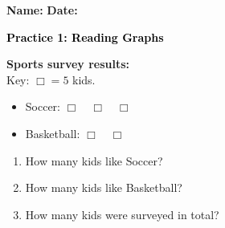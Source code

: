 \documentclass[12pt, letterpaper, fleqn]{article}
\newcommand{\blank}{\underline{\hspace{2.2cm}}}
\begin{document}
\textbf{Name:} \underline{\hspace{5cm}}
\hfill
\textbf{Date:} \underline{\hspace{3cm}}\\

\begin{tcolorbox}[colback=customteal!20]
    \large\textcolor{black}{\textbf{Practice 1: Reading Graphs}}
\end{tcolorbox}

\vspace{5mm}
\noindent
\textbf{Sports survey results:}
\\
Key: $\Box = 5$ kids.
\begin{itemize}
  \item Soccer: $\Box \quad \Box \quad \Box$
  \item Basketball: $\Box \quad \Box$
\end{itemize}

\vspace{5mm}
\begin{enumerate}[itemsep=2.5cm, leftmargin=0.6cm]
\item How many kids like Soccer? \blank
\item How many kids like Basketball? \blank
\item How many kids were surveyed in total? \blank
\end{enumerate}
\end{document}
